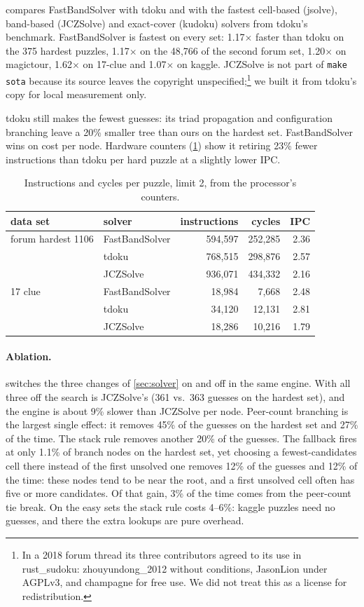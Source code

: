 \documentclass[11pt]{article}
\theoremstyle{definition}
\theoremstyle{plain}
\begin{document}
 compares FastBandSolver with tdoku and with the fastest cell-based (jsolve), band-based (JCZSolve)
and exact-cover (kudoku) solvers from tdoku's benchmark. FastBandSolver is fastest on every set: 1.17$\times$ faster
than tdoku on the 375 hardest puzzles, 1.17$\times$ on the 48{,}766 of the second forum set, 1.20$\times$ on
magictour, 1.62$\times$ on 17-clue and 1.07$\times$ on kaggle. JCZSolve is not part of \texttt{make sota} because its
source leaves the copyright unspecified;\footnote{In a 2018 forum thread its three contributors agreed to its use in
rust\_sudoku: zhouyundong\_2012 without conditions, JasonLion under AGPLv3, and champagne for free use. We did not
treat this as a license for redistribution.} we built it from tdoku's copy for local measurement only.

tdoku still makes the fewest guesses: its triad propagation and configuration branching leave a 20\% smaller tree
than ours on the hardest set. FastBandSolver wins on cost per node. Hardware counters (\cref{tab:counters}) show it
retiring 23\% fewer instructions than tdoku per hard puzzle at a slightly lower IPC.

\begin{table}[t]
\centering
\caption{Instructions and cycles per puzzle, limit 2, from the processor's counters.}
\label{tab:counters}
\begin{tabular}{llrrr}
\toprule
data set & solver & instructions & cycles & IPC \\
\midrule
forum hardest 1106 & FastBandSolver & 594{,}597 & 252{,}285 & 2.36 \\
 & tdoku & 768{,}515 & 298{,}876 & 2.57 \\
 & JCZSolve & 936{,}071 & 434{,}332 & 2.16 \\
\midrule
17 clue & FastBandSolver & 18{,}984 & 7{,}668 & 2.48 \\
 & tdoku & 34{,}120 & 12{,}131 & 2.81 \\
 & JCZSolve & 18{,}286 & 10{,}216 & 1.79 \\
\bottomrule
\end{tabular}
\end{table}

\paragraph{Ablation.}  switches the three changes of \cref{sec:solver} on and off in the same
engine. With all three off the search is JCZSolve's (361 vs.\ 363 guesses on the hardest set), and the engine is about 9\% slower than JCZSolve per node. Peer-count branching is the largest single effect: it removes 45\% of the guesses on the hardest set and 27\% of the time. The stack rule removes another 20\% of the guesses. The fallback
fires at only 1.1\% of branch nodes on the hardest set, yet choosing a fewest-candidates cell there instead of the
first unsolved one removes 12\% of the guesses and 12\% of the time: these nodes tend to be near the root, and a
first unsolved cell often has five or more candidates. Of that gain, 3\% of the time comes from the peer-count tie
break. On the easy sets the stack rule costs 4--6\%: kaggle puzzles need no guesses, and there the extra
lookups are pure overhead.
\end{document}
